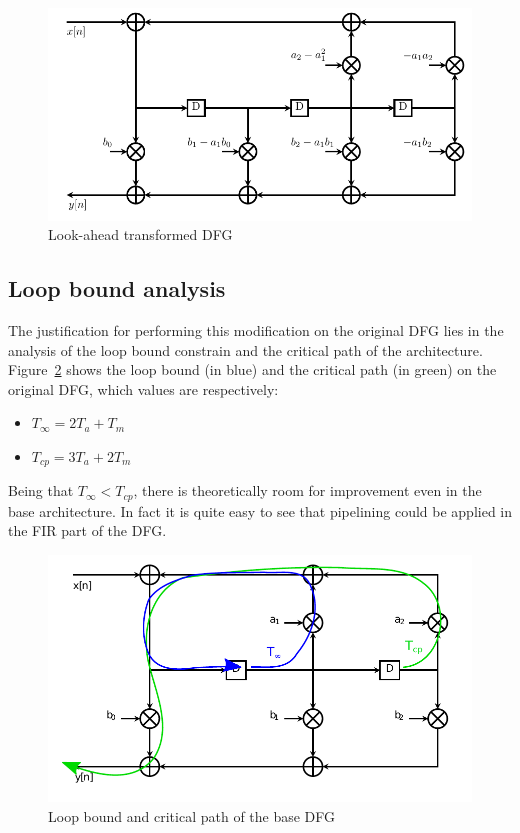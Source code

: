 \documentclass[a4paper]{article}
\begin{document}
\begin{figure}[hbtp]
    \centering
    \includegraphics[width=.9\linewidth]{media/lookahead_dfg.pdf}
    \caption{Look-ahead transformed DFG}
    \label{fig:lookahead_dfg}
\end{figure}

\subsection{Loop bound analysis}
The justification for performing this modification on the original DFG lies in the analysis of the loop bound constrain and the critical path of the architecture. Figure~\ref{fig:base_dfg_lbcp} shows the loop bound (in blue) and the critical path (in green) on the original DFG, which values are respectively:
\begin{itemize}
    \item $T_\infty = 2T_a + T_m$
    \item $T_{cp} = 3T_a + 2T_m$
\end{itemize}
Being that $T_\infty < T_{cp}$, there is theoretically room for improvement even in the base architecture. In fact it is quite easy to see that pipelining could be applied in the FIR part of the DFG.

\begin{figure}[hbtp]
    \centering
    \includegraphics[width=.8\linewidth]{media/base_dfg_lbcp.pdf}
    \caption{Loop bound and critical path of the base DFG}
    \label{fig:base_dfg_lbcp}
\end{figure}
\end{document}
